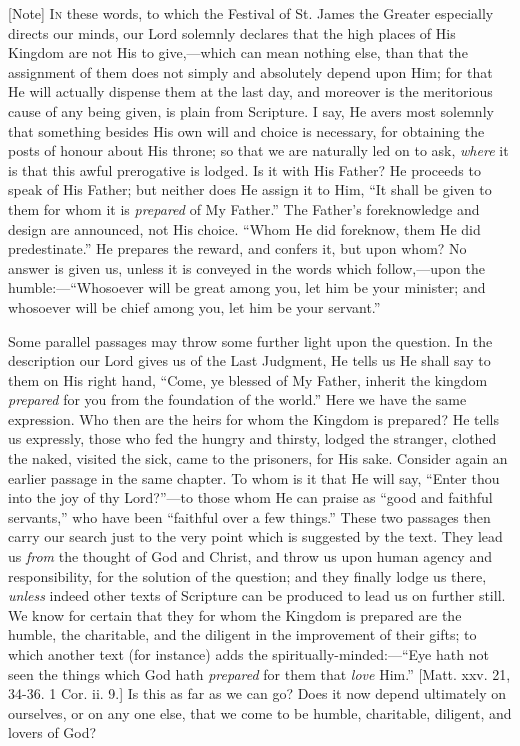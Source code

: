 [Note] I\textsc{n} these words, to which the
Festival of St. James the Greater especially directs our minds, our Lord
solemnly declares that the high places of His Kingdom are not His to
give,—which can mean nothing else, than that the assignment of them
does not simply and absolutely depend upon Him; for that He will
actually dispense them at the last day, and moreover is the meritorious
cause of any being given, is plain from Scripture. I say, He avers most
solemnly that something besides His own will and choice is necessary,
for obtaining the posts of honour about His throne; so that we are
naturally led on to ask, \emph{where} it is that this awful prerogative
is lodged. Is it with His Father? He proceeds to speak of His Father;
but neither does He assign it to Him, ``It shall be given to them
for whom it is \emph{prepared} of My Father.'' The Father's
foreknowledge and design are announced, not His choice. ``Whom He
did foreknow, them He did predestinate.'' He prepares the reward,
and confers it, but upon whom? No answer is given us, unless it is
conveyed in the words which follow,—upon the humble:—``Whosoever
will be great among you, let him be your minister; and whosoever will be
chief among you, let him be your servant.''

Some parallel passages may throw some further light upon the
question. In the description our Lord gives us of the Last Judgment, He
tells us He shall say to them on His right hand, ``Come, ye blessed
of My Father, inherit the kingdom \emph{prepared} for you from the
foundation of the world.'' Here we have the same expression. Who
then are the heirs for whom the Kingdom is prepared? He tells us
expressly, those who fed the hungry and thirsty, lodged the stranger,
clothed the naked, visited the sick, came to the prisoners, for His
sake. Consider again an earlier passage in the same chapter. To whom is
it that He will say, ``Enter thou into the joy of thy
Lord?''—to those whom He can praise as ``good and faithful
servants,'' who have been ``faithful over a few things.''
These two passages then carry our search just to the very point which is
suggested by the text. They lead us \emph{from} the thought of God and
Christ, and throw us upon human agency and responsibility, for the
solution of the question; and they finally lodge us there, \emph{unless}
indeed other texts of Scripture can be produced to lead us on further
still. We know for certain that they for whom the Kingdom is prepared
are the humble, the charitable, and the diligent in the improvement of
their gifts; to which another text (for instance) adds the
spiritually-minded:—``Eye hath not seen the things which God hath \emph{prepared}
for them that \emph{love} Him.'' [Matt. xxv. 21, 34-36. 1 Cor. ii. 9.] Is
this as far as we can go? Does it now depend ultimately on ourselves, or
on any one else, that we come to be humble, charitable, diligent, and
lovers of God?

